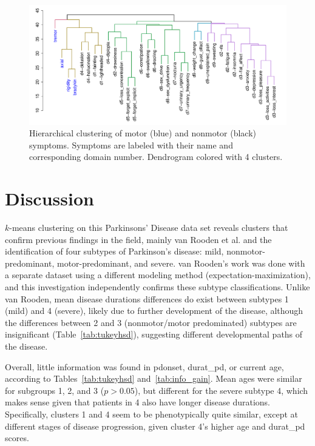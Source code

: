 \documentclass[preprint,3p,twocolumn]{elsarticle} %
\begin{document}
\begin{figure}[t]
  \centering
  \includegraphics[width=\linewidth]{nms30m-colhc-pub.pdf}
  \caption{Hierarchical clustering of motor (blue) and nonmotor (black) symptoms. Symptoms are
  labeled with their name and corresponding domain number. Dendrogram colored with 4 clusters.}
  \label{fig:hc}
\end{figure}

\section{Discussion}

$k$-means clustering on this Parkinsons' Disease data set reveals clusters that confirm previous
findings in the field, mainly van Rooden et al.\cite{vanrooden10} and the identification of four
subtypes of Parkinson's disease: mild, nonmotor-predominant, motor-predominant, and severe.  van
Rooden's work was done with a separate dataset using a different modeling method
(expectation-maximization), and this investigation independently confirms these subtype
classifications. Unlike van Rooden, mean disease durations differences do exist between subtypes 1
(mild) and 4 (severe), likely due to further development of the disease, although the differences
between 2 and 3 (nonmotor/motor predominated) subtypes are insignificant
(Table~\ref{tab:tukeyhsd}), suggesting different developmental paths of the disease.

Overall, little information was found in pdonset,
durat\_pd, or current age, according to Tables~\ref{tab:tukeyhsd}
and~\ref{tab:info_gain}.  Mean ages were similar for subgroups 1, 2, and 3 ($p >
0.05$), but different for the severe subtype 4, which makes sense given that
patients in 4 also have longer disease durations. Specifically, clusters 1 and
4 seem to be phenotypically quite similar, except at different stages of
disease progression, given cluster 4's higher age and durat\_pd scores.
\end{document}
